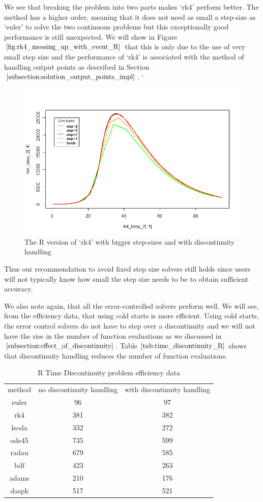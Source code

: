 We see that breaking the problem into two parts makes `rk4' perform better. The method has a higher order, meaning that it does not need as small a step-size as `euler' to solve the two continuous problems but this exceptionally good performance is still unexpected. We will show in Figure $\ref{fig:rk4_messing_up_with_event_R}$ that this is only due to the use of very small step size and the performance of `rk4' is associated with the method of handling output points as described in Section $\ref{subsection:solution_output_points_impl}$.
`
\begin{figure}[H]
\centering
\includegraphics[width=0.7\linewidth]{./figures/rk4_messing_up_with_event_R}
\caption{The R version of `rk4' with bigger step-sizes and with discontinuity handling}
\label{fig:rk4_messing_up_with_event_R}
\end{figure}

Thus our recommendation to avoid fixed step size solvers still holds since users will not typically know how small the step size needs to be to obtain sufficient accuracy.

We also note again, that all the error-controlled solvers perform well. We will see, from the efficiency data, that using cold starts is more efficient. Using cold starts, the error control solvers do not have to step over a discontinuity and we will not have the rise in the number of function evaluations as we discussed in $\ref{subsection:effect_of_discontinuity}$. Table $\ref{tab:time_discontinuity_R}$ shows that discontinuity handling reduces the number of function evaluations. 

\begin{table}[H]
\caption {R Time Discontinuity problem efficiency data} \label{tab:time_discontinuity_R}
\begin{center}
\begin{tabular}{ c c c } 
method & no discontinuity handling & with discontinuity handling \\ 
euler & 96 & 97 \\
rk4 & 381 & 382 \\ 
lsoda & 332 & 272 \\
ode45 & 735 & 599 \\
radau & 679 & 585 \\
bdf & 423 & 263 \\
adams & 210 & 176 \\
daspk & 517 & 521
\end{tabular}
\end{center}
\end{table}

